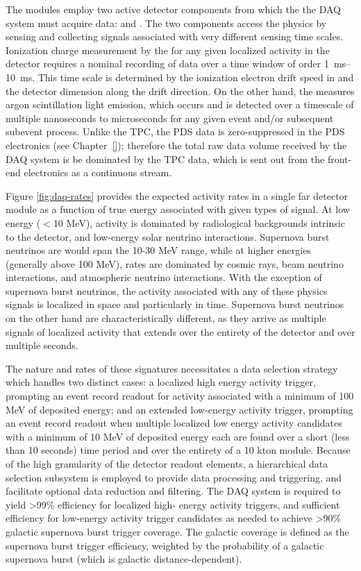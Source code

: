 The   modules employ two
active detector components from which the the DAQ system must acquire data:  and . The two components access the physics %
by sensing and collecting signals associated with very different 
sensing time scales.
Ionization charge measurement by the  for any given
localized activity in the detector requires a
nominal recording of data over a time window of order 
\SIrange{1}{10}{\milli\second}. 
This time scale is determined by the ionization electron drift speed in
\lar and the detector dimension along the drift direction.
On the other hand, the  measures argon scintillation light emission, which
occurs and is detected over a timescale of multiple nanoseconds to
microseconds for
any given event and/or subsequent subevent process. Unlike the TPC,
the PDS data is zero-suppressed in
the PDS electronics (see Chapter~\ref{}); therefore the total raw data volume received by
the DAQ system is be dominated by
the TPC data, which is sent out from the front-end electronics as a continuous stream.
 
Figure \ref{fig:daq-rates} provides the expected activity rates in a
single far detector module as a function of true energy associated
with given types of signal.
At low energy ($<$10 MeV), activity is dominated by radiological backgrounds
intrinsic to the detector, and
low-energy solar neutrino interactions. Supernova burst neutrinos are
would span the 10-30 MeV range, while at higher energies (generally
above 100 MeV), rates are dominated by cosmic rays, beam neutrino interactions,
and atmospheric neutrino interactions. With the exception of supernova
burst neutrinos, the activity associated with any of these physics
signals is localized in space and particularly in time. Supernova burst
neutrinos on the other hand are characteristically different, as they arrive as multiple
signals of localized activity that extends over the entirety of the
detector and over multiple seconds. 

The nature and rates of these signatures necessitates a data selection strategy which handles two
distinct cases: a localized high energy activity trigger, prompting an event record readout for
activity associated with a minimum of 100 MeV of deposited energy; and an extended
low-energy activity trigger, prompting an event record readout when
multiple localized low energy activity candidates with a minimum of
10 MeV of deposited energy each are found over a short (less than 10
seconds) time period and over the entirety of a 10 kton
module. Because of the high granularity of the detector readout elements, a
hierarchical data selection subsystem is employed to provide data processing and
triggering, and facilitate optional data reduction and filtering. The
DAQ  
system is required to yield >99\% efficiency for localized high-
energy activity triggers, and sufficient efficiency for low-energy
activity trigger candidates as needed to achieve >90\% galactic
supernova burst trigger coverage. The galactic coverage is defined as
the supernova burst trigger efficiency, weighted by the probability of
a galactic supernova burst (which is galactic distance-dependent).

